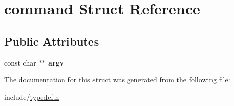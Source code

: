 \hypertarget{structcommand}{}\section{command Struct Reference}
\label{structcommand}
\subsection*{Public Attributes}
\begin{DoxyCompactItemize}
\item 
const char $\ast$$\ast$ {\bfseries argv}\hypertarget{structcommand_a997f4f41a0e711df10c1cae633973bf2}{}\label{structcommand_a997f4f41a0e711df10c1cae633973bf2}

\end{DoxyCompactItemize}


The documentation for this struct was generated from the following file\+:\begin{DoxyCompactItemize}
\item 
include/\hyperlink{typedef_8h}{typedef.\+h}\end{DoxyCompactItemize}
